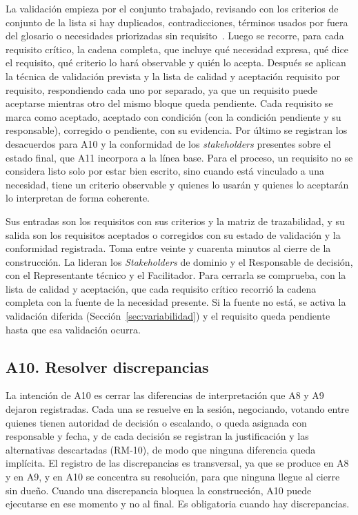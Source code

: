 \documentclass[12pt,letterpaper,oneside]{report}
\begin{document}
La validación empieza por el conjunto trabajado, revisando con los criterios de
conjunto de la lista si hay duplicados, contradicciones, términos usados por
fuera del glosario o necesidades priorizadas sin requisito~\cite{iso29148}. Luego
se recorre, para cada requisito crítico, la cadena completa, que incluye qué
necesidad expresa, qué dice el requisito, qué criterio lo hará observable y
quién lo acepta. Después se aplican la técnica de validación prevista y la lista de
calidad y aceptación requisito por requisito, respondiendo cada uno por
separado, ya que un requisito puede aceptarse mientras otro del mismo bloque
queda pendiente. Cada requisito se marca como aceptado, aceptado con condición
(con la condición pendiente y su responsable), corregido o pendiente, con su
evidencia. Por último se registran los desacuerdos para A10 y la conformidad de
los \textit{stakeholders} presentes sobre el estado final, que A11 incorpora a la
línea base. Para el proceso, un requisito no se considera
listo solo por estar bien escrito, sino cuando está vinculado a una necesidad,
tiene un criterio observable y quienes lo usarán y quienes lo aceptarán lo
interpretan de forma coherente.

Sus entradas son los requisitos con sus criterios y la matriz de trazabilidad, y
su salida son los requisitos aceptados o corregidos con su estado de validación
y la conformidad registrada. Toma entre veinte y cuarenta minutos al cierre de
la construcción. La lideran los \textit{Stakeholders} de dominio y el Responsable de
decisión, con el Representante técnico y el Facilitador. Para cerrarla se
comprueba, con la lista de calidad y aceptación, que cada requisito crítico
recorrió la cadena completa con la fuente de la necesidad presente. Si la fuente
no está, se activa la validación diferida (Sección~\ref{sec:variabilidad}) y el
requisito queda pendiente hasta que esa validación ocurra.

\subsection{A10. Resolver discrepancias}
La intención de A10 es cerrar las diferencias de interpretación que A8 y A9
dejaron registradas. Cada una se resuelve en la sesión, negociando, votando entre
quienes tienen autoridad de decisión o escalando, o queda asignada con
responsable y fecha, y de cada decisión se registran la justificación y las
alternativas descartadas (RM-10), de modo que ninguna diferencia queda
implícita. El registro de las discrepancias es transversal, ya que se produce en
A8 y en A9, y en A10 se concentra su resolución, para que ninguna llegue al
cierre sin dueño. Cuando una discrepancia bloquea la construcción, A10 puede
ejecutarse en ese momento y no al final. Es obligatoria cuando hay
discrepancias.
\end{document}
